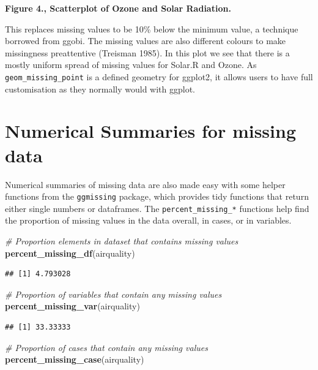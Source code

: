 \documentclass[]{article}
\newenvironment{Shaded}{\begin{snugshade}}{\end{snugshade}}
\newcommand{\KeywordTok}[1]{\textcolor[rgb]{0.13,0.29,0.53}{\textbf{{#1}}}}
\newcommand{\CommentTok}[1]{\textcolor[rgb]{0.56,0.35,0.01}{\textit{{#1}}}}
\newcommand{\NormalTok}[1]{{#1}}
\begin{document}
\textbf{Figure 4., Scatterplot of Ozone and Solar Radiation.}

This replaces missing values to be 10\% below the minimum value, a
technique borrowed from ggobi. The missing values are also different
colours to make missingness preattentive (Treisman 1985). In this plot
we see that there is a mostly uniform spread of missing values for
Solar.R and Ozone. As \texttt{geom\_missing\_point} is a defined
geometry for ggplot2, it allows users to have full customisation as they
normally would with ggplot.

\section{Numerical Summaries for missing
data}\label{numerical-summaries-for-missing-data}

Numerical summaries of missing data are also made easy with some helper
functions from the \texttt{ggmissing} package, which provides tidy
functions that return either single numbers or dataframes. The
\texttt{percent\_missing\_*} functions help find the proportion of
missing values in the data overall, in cases, or in variables.

\begin{Shaded}
\begin{Highlighting}[]
\CommentTok{# Proportion elements in dataset that contains missing values}
\KeywordTok{percent_missing_df}\NormalTok{(airquality)}
\end{Highlighting}
\end{Shaded}

\begin{verbatim}
## [1] 4.793028
\end{verbatim}

\begin{Shaded}
\begin{Highlighting}[]
\CommentTok{# Proportion of variables that contain any missing values}
\KeywordTok{percent_missing_var}\NormalTok{(airquality)}
\end{Highlighting}
\end{Shaded}

\begin{verbatim}
## [1] 33.33333
\end{verbatim}

\begin{Shaded}
\begin{Highlighting}[]
 \CommentTok{# Proportion of cases that contain any missing values}
\KeywordTok{percent_missing_case}\NormalTok{(airquality)}
\end{Highlighting}
\end{Shaded}
\end{document}
